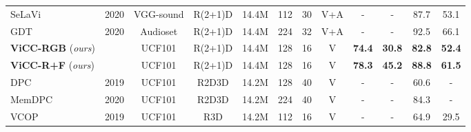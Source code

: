 \documentclass[10pt,twocolumn,letterpaper]{article}
\newcommand\Tstrut{\rule{0pt}{2.2ex}}         \newcommand\Bstrut{\rule[-0.9ex]{0pt}{0pt}}   \usepackage{booktabs}
\begin{document}
\begin{table*}
\begin{center}
{\begin{tabular}{lccccccccccc}
{\color[HTML]{9B9B9B} SeLaVi \cite{asano_labelling_2020}}      		& {\color[HTML]{9B9B9B} 2020} & {\color[HTML]{9B9B9B} VGG-sound \cite{chen_vggsound_2020}} & {\color[HTML]{9B9B9B} R(2+1)D}  & {\color[HTML]{9B9B9B} 14.4M} & {\color[HTML]{9B9B9B} 112} & {\color[HTML]{9B9B9B} 30} & {\color[HTML]{9B9B9B} V+A} &	-	 &    -      & {\color[HTML]{9B9B9B} 87.7} & {\color[HTML]{9B9B9B} 53.1} \\ 
{\color[HTML]{9B9B9B} GDT \cite{patrick_multi-modal_2020}}       									& {\color[HTML]{9B9B9B} 2020} & {\color[HTML]{9B9B9B} Audioset \cite{gemmeke_audio_2017}} & {\color[HTML]{9B9B9B} R(2+1)D}  & {\color[HTML]{9B9B9B} 14.4M} & {\color[HTML]{9B9B9B} 224} & {\color[HTML]{9B9B9B} 32} & {\color[HTML]{9B9B9B} V+A} &	-	 &     -      & {\color[HTML]{9B9B9B} 92.5} & {\color[HTML]{9B9B9B} 66.1} \\\hline \Tstrut
\textbf{ViCC-RGB} (\textit{ours})                			&                             & UCF101                         & R(2+1)D                         & 14.4M                        & 128                        & 16
& V                        &	\textbf{74.4}	 &  \textbf{30.8}    	      	& \textbf{82.8}               &              \textbf{52.4}               \\ 
\textbf{ViCC-R+F} (\textit{ours})               &		                      & UCF101                         & R(2+1)D                         & 14.4M                        & 128                        & 16
& V                        &	\textbf{78.3}	 &      \textbf{45.2}	       	& \textbf{88.8}               &    \textbf{61.5}                          \\ \hline \Tstrut
DPC  \cite{han_video_2019}                              			& 2019                        & UCF101                         & R2D3D                        & 14.2M                        & 128                        & 40                        & V                     &	-	 &     - & 60.6                        & -                           \\
MemDPC  \cite{han_memory-augmented_2020}		& 2020                        & UCF101                         & R2D3D                        & 14.2M                        & 224                        & 40                        & V                        &	-	 &    -        & 84.3 
& -                           \\
\hline \Tstrut
VCOP   \cite{xu_self-supervised_2019}     & 2019                      & UCF101                          & R3D                          & 14.2M                        & 112                        & 16                        & V                      &	-	 &    -       & 64.9                        & 29.5                        \\

\end{tabular}}
\end{center}
\end{table*}
\end{document}
